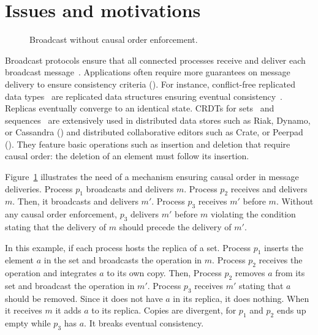 
\section{Issues and motivations}
\label{sec:motivations}

\begin{figure}
  \begin{center}
  
  \caption{\label{fig:generalproblem}Broadcast without causal order
    enforcement.}
  \end{center}
\end{figure}



Broadcast protocols ensure that all connected processes receive and deliver each
broadcast message~\cite{hadzilacos1994modular}. Applications often require more
guarantees on message delivery to ensure consistency criteria (\REF). For
instance, conflict-free replicated data types~\cite{shapiro2011comprehensive}
are replicated data structures ensuring eventual
consistency~\cite{bailis2013eventual}. Replicas eventually converge to an
identical state. CRDTs for sets~\cite{mukund2014optimized} and
sequences~\cite{weiss2009logoot} are extensively used in distributed data stores
such as Riak, Dynamo, or Cassandra (\REF) and distributed collaborative editors
such as Crate, or Peerpad (\REF). They feature basic operations such as
insertion and deletion that require causal order: the deletion of an element
must follow its insertion.

Figure~\ref{fig:generalproblem} illustrates the need of a mechanism ensuring
causal order in message deliveries. Process $p_1$ broadcasts and delivers
$m$. Process $p_2$ receives and delivers $m$. Then, it broadcasts and delivers
$m'$. Process $p_3$ receives $m'$ before $m$. Without any causal order
enforcement, $p_3$ delivers $m'$ before $m$ violating the condition stating that
the delivery of $m$ should precede the delivery of $m'$.

In this example, if each process hosts the replica of a set. Process $p_1$
inserts the element $a$ in the set and broadcasts the operation in $m$. Process
$p_2$ receives the operation and integrates $a$ to its own copy. Then, Process
$p_2$ removes $a$ from its set and broadcast the operation in $m'$. Process
$p_3$ receives $m'$ stating that $a$ should be removed. Since it does not have
$a$ in its replica, it does nothing. When it receives $m$ it adds $a$ to its
replica. Copies are divergent, for $p_1$ and $p_2$ ends up empty while $p_3$ has
$a$. It breaks eventual consistency.

